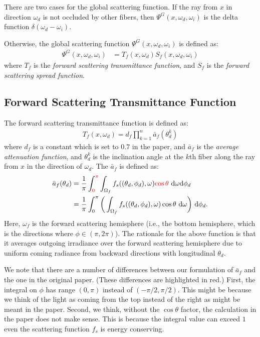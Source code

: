 \documentclass[10pt]{article}
\newcommand{\dee}{\mathrm{d}}
\begin{document}
  There are two cases for the global scattering function.  If the ray from $x$ in direction $\omega_d$ is not occluded by other fibers, then $\Psi^G(x, \omega_d, \omega_i)$ is the delta function $\delta(\omega_d - \omega_i)$.

  Otherwise, the global scattering function $\Psi^G(x, \omega_d, \omega_i)$ is defined as:
  \begin{align*}
  	\Psi^G(x, \omega_d, \omega_i) &= T_f(x, \omega_d) S_f(x, \omega_d, \omega_i)
  \end{align*}
  where $T_f$ is the \emph{forward scattering transmittance function}, and $S_f$ is the \emph{forward scattering spread function}.

  \subsection{Forward Scattering Transmittance Function} \label{forward-transmittance}
  The forward scattering transmittance function is defined as:
  \begin{align*}
  	T_f(x,\omega_d) = d_f \prod_{k=1}^n \bar{a}_f (\theta_d^k)
  \end{align*}
  where $d_f$ is a constant which is set to $0.7$ in the paper, and $\bar{a}_f$ is the \emph{average attenuation function}, and $\theta_d^k$ is the inclination angle at the $k$th fiber along the ray from $x$ in the direction of $\omega_d$.  The $\bar{a}_f$ is defined as:
  \begin{align*}
  	\bar{a}_f(\theta_d) 
  	&= \frac{1}{\pi} \int_{\textcolor{red}{0}}^{\textcolor{red}{\pi}} \int_{\Omega_f} f_s((\theta_d,\phi_d), \omega) \textcolor{red}{\cos\theta}\ \dee \omega\dee \phi_d \\
  	&= \frac{1}{\pi} \int_{0}^{\pi}\bigg( \int_{\Omega_f} f_s((\theta_d,\phi_d), \omega)\cos\theta\ \dee \omega  \bigg)\ \dee \phi_d.
  \end{align*}
  Here, $\omega_f$ is the forward scattering hemisphere (i.e., the bottom hemisphere, which is the directions where $\phi \in (\pi, 2\pi)$).  The rationale for the above function is that it averages outgoing irradiance over the forward scattering hemisphere due to uniform coming radiance from backward directions with longitudinal $\theta_d$.

  We note that there are a number of differences between our formulation of $\bar{a}_f$ and the one in the original paper.  (These differences are highlighted in red.) First, the integral on $\phi$ has range $(0,\pi)$ instead of $(-\pi/2, \pi/2)$.  This might be because we think of the light as coming from the top instead of the right as might be meant in the paper.  Second, we think, without the $\cos \theta$ factor, the calculation in the paper does not make sense.  This is because the integral value can exceed $1$ even the scattering function $f_s$ is energy conserving.
\end{document}
